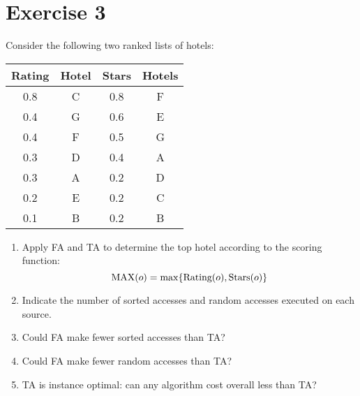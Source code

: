 \section{Exercise 3}

Consider the following two ranked lists of hotels: 
\begin{table}[H]
    \centering
    \begin{tabular}{cc|cc}
    \hline
    \textbf{Rating} & \textbf{Hotel} & \textbf{Stars} & \textbf{Hotels} \\ \hline
    0.8             & C              & 0.8            & F               \\
    0.4             & G              & 0.6            & E               \\
    0.4             & F              & 0.5            & G               \\
    0.3             & D              & 0.4            & A               \\
    0.3             & A              & 0.2            & D               \\
    0.2             & E              & 0.2            & C               \\
    0.1             & B              & 0.2            & B               \\ \hline
    \end{tabular}
\end{table}
\begin{enumerate}
    \item Apply FA and TA to determine the top hotel according to the scoring function: 
        \[\textnormal{MAX}(o) = \max\{\textnormal{Rating}(o), \textnormal{Stars}(o)\}\] 
    \item Indicate the number of sorted accesses and random accesses executed on each source. 
    \item Could FA make fewer sorted accesses than TA?
    \item Could FA make fewer random accesses than TA?
    \item TA is instance optimal: can any algorithm cost overall less than TA?
\end{enumerate}

